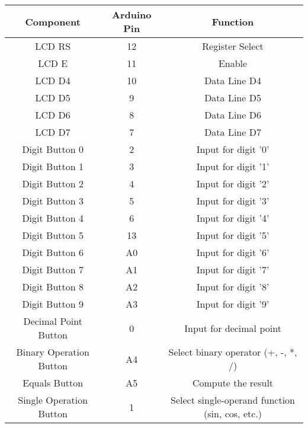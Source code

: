 
    \begin{tabular}{|c|c|c|}
        \hline
        \textbf{Component} & \textbf{Arduino Pin} & \textbf{Function} \\
        \hline
        LCD RS       & 12  & Register Select \\
        LCD E        & 11  & Enable \\
        LCD D4       & 10  & Data Line D4 \\
        LCD D5       & 9   & Data Line D5 \\
        LCD D6       & 8   & Data Line D6 \\
        LCD D7       & 7   & Data Line D7 \\
        \hline
        Digit Button 0 & 2  & Input for digit '0' \\
        Digit Button 1 & 3  & Input for digit '1' \\
        Digit Button 2 & 4  & Input for digit '2' \\
        Digit Button 3 & 5  & Input for digit '3' \\
        Digit Button 4 & 6  & Input for digit '4' \\
        Digit Button 5 & 13 & Input for digit '5' \\
        Digit Button 6 & A0 & Input for digit '6' \\
        Digit Button 7 & A1 & Input for digit '7' \\
        Digit Button 8 & A2 & Input for digit '8' \\
        Digit Button 9 & A3 & Input for digit '9' \\
        \hline
        Decimal Point Button & 0  & Input for decimal point \\
        Binary Operation Button & A4 & Select binary operator (+, -, *, /) \\
        Equals Button  & A5  & Compute the result \\
        Single Operation Button & 1  & Select single-operand function (sin, cos, etc.) \\
        \hline
    \end{tabular}


